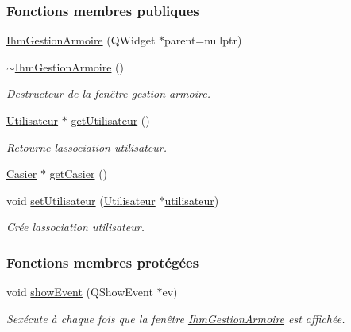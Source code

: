 \subsubsection*{Fonctions membres publiques}
\begin{DoxyCompactItemize}
\item 
\hyperlink{class_ihm_gestion_armoire_a7aa5e1514dd5d1b5648a2f6dd36970f9}{Ihm\+Gestion\+Armoire} (Q\+Widget $\ast$parent=nullptr)
\item 
\hyperlink{class_ihm_gestion_armoire_a6d854653399972a013f79edfe32b04cb}{$\sim$\+Ihm\+Gestion\+Armoire} ()
\begin{DoxyCompactList}\small\item\em Destructeur de la fenêtre gestion armoire. \end{DoxyCompactList}\item 
\hyperlink{class_utilisateur}{Utilisateur} $\ast$ \hyperlink{class_ihm_gestion_armoire_a024905507f9700b2afa794d7c357546f}{get\+Utilisateur} ()
\begin{DoxyCompactList}\small\item\em Retourne l\textquotesingle{}association utilisateur. \end{DoxyCompactList}\item 
\hyperlink{class_casier}{Casier} $\ast$ \hyperlink{class_ihm_gestion_armoire_a347e1dc419cb74e5046dc95b5ffbf09e}{get\+Casier} ()
\item 
void \hyperlink{class_ihm_gestion_armoire_af63a0c4424edd90a3c45506dde527b4e}{set\+Utilisateur} (\hyperlink{class_utilisateur}{Utilisateur} $\ast$\hyperlink{class_ihm_gestion_armoire_aa14adf3863cf09947411fc33e413076c}{utilisateur})
\begin{DoxyCompactList}\small\item\em Crée l\textquotesingle{}association utilisateur. \end{DoxyCompactList}\end{DoxyCompactItemize}
\subsubsection*{Fonctions membres protégées}
\begin{DoxyCompactItemize}
\item 
void \hyperlink{class_ihm_gestion_armoire_ad0f3d63f9b93fc902de40a9a546f709c}{show\+Event} (Q\+Show\+Event $\ast$ev)
\begin{DoxyCompactList}\small\item\em S\textquotesingle{}exécute à chaque fois que la fenêtre \hyperlink{class_ihm_gestion_armoire}{Ihm\+Gestion\+Armoire} est affichée. \end{DoxyCompactList}\end{DoxyCompactItemize}
